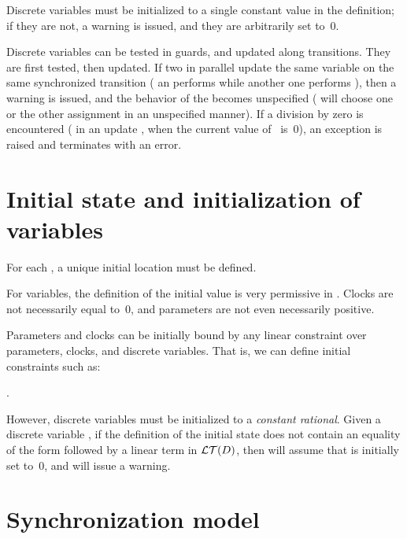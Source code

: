 Discrete variables must be initialized to a single constant value in the  definition;
if they are not, a warning is issued, and they are arbitrarily set to~0.

Discrete variables can be tested in guards, and updated along transitions.
They are first tested, then updated.
If two \IPTA{} in parallel update the same variable on the same synchronized transition (\eg{} an \IPTA{} performs  while another one performs ), then a warning is issued, and the behavior of the \NIPTA{} becomes unspecified (\ie{} \imitator{} will choose one or the other assignment in an unspecified manner).
If a division by zero is encountered (\eg{} in an update , when the current value of~ is~0), an exception is raised and \imitator{} terminates with an error.



\section{Initial state and initialization of variables}\label{section:init}

For each \IPTA{}, a unique initial location must be defined.

For variables, the definition of the initial value is very permissive in \imitator{}.
Clocks are not necessarily equal to~0, and parameters are not even necessarily positive.

Parameters and clocks can be initially bound by any linear constraint over parameters, clocks, and discrete variables.
That is, we can define initial constraints such as:
\begin{center}
	.
\end{center}

However, discrete variables must be initialized to a \emph{constant rational}.
Given a discrete variable , if the definition of the initial state does not contain an equality of the form  followed by a linear term in $\mathcal{LT}(D)$, then \imitator{} will assume that  is initially set to~0, and will issue a warning.



\section{Synchronization model}\label{sect:synchronization}

